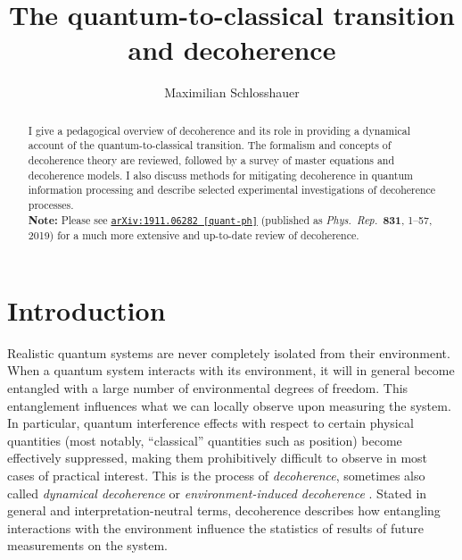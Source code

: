 \documentclass[aps,pra,reprint,amsmath,amssymb,showpacs,nofootinbib,floatfix,onecolumn,12pt]{revtex4-1}
\begin{document}
\title{The quantum-to-classical transition and decoherence}
\author{Maximilian Schlosshauer} 

\begin{abstract}
I give a pedagogical overview of decoherence and its role in providing a dynamical account of the quantum-to-classical transition. The formalism and concepts of decoherence theory are reviewed, followed by a survey of master equations and decoherence models. I also discuss methods for mitigating decoherence in quantum information processing and describe selected experimental investigations of decoherence processes.\\[-.3cm]

{\bf Note:} Please see \href{https://arxiv.org/abs/1911.06282}{\texttt{arXiv:1911.06282 [quant-ph]}} (published as \emph{Phys.\ Rep.\ }{\bf 831}, 1--57, 2019) for a much more extensive and up-to-date review of decoherence.
\end{abstract}

\maketitle

\tableofcontents

\newpage

\section{Introduction}

Realistic quantum systems are never completely isolated from their environment. When a quantum system interacts with its environment, it will in general become entangled with a large number of environmental degrees of freedom. This entanglement influences what we can locally observe upon measuring the system. In particular, quantum interference effects with respect to certain physical quantities (most notably, ``classical'' quantities such as position) become effectively suppressed, making them prohibitively difficult to observe in most cases of practical interest. This is the process of \emph{decoherence}, sometimes also called \emph{dynamical decoherence} or \emph{environment-induced decoherence} \cite{Zeh:1970:yt,Zurek:1981:dd,Zurek:1982:tv,Paz:2001:aa,Zurek:2002:ii,Schlosshauer:2003:tv,Bacciagaluppi:2003:yz,Joos:2003:jh,Schlosshauer:2007:un,Schlosshauer:2019:qd}. Stated in general and interpretation-neutral terms, decoherence describes how entangling interactions with the environment influence the statistics of results of future measurements on the system. 
\end{document}
